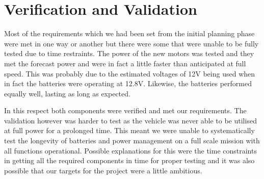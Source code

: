 \section{Verification and Validation}
Most of the requirements which we had been set from the initial planning phase were met in one way or another but there were some that were unable to be fully tested due to time restraints.  
The power of the new motors was tested and they met the forecast power and were in fact a little faster than anticipated at full speed.  This was probably due to the estimated voltages of 12V being used when in fact the batteries were operating at 12.8V.  Likewise, the batteries performed equally well, lasting as long as expected.

In this respect both components were verified and met our requirements.  The validation however was harder to test as the vehicle was never able to be utilised at full power for a prolonged time.  This meant we were unable to systematically test the longevity of batteries and power management on a full scale mission with all functions operational.  Possible explanations for this were the time constraints in getting all the required components in time for proper testing and it was also possible that our targets for the project were a little ambitious.  
